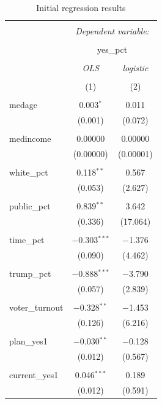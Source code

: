 \documentclass[
]{article}
\begin{document}
\begin{table}[!htbp] \centering 
  \caption{Initial regression results} 
  \label{initialResults} 
\begin{tabular}{@{\extracolsep{5pt}}lcc} 
\\[-1.8ex]\hline 
\hline \\[-1.8ex] 
 & \multicolumn{2}{c}{\textit{Dependent variable:}} \\ 
\cline{2-3} 
\\[-1.8ex] & \multicolumn{2}{c}{yes\_pct} \\ 
\\[-1.8ex] & \textit{OLS} & \textit{logistic} \\ 
\\[-1.8ex] & (1) & (2)\\ 
\hline \\[-1.8ex] 
 medage & 0.003$^{*}$ & 0.011 \\ 
  & (0.001) & (0.072) \\ 
  & & \\ 
 medincome & 0.00000 & 0.00000 \\ 
  & (0.00000) & (0.00001) \\ 
  & & \\ 
 white\_pct & 0.118$^{**}$ & 0.567 \\ 
  & (0.053) & (2.627) \\ 
  & & \\ 
 public\_pct & 0.839$^{**}$ & 3.642 \\ 
  & (0.336) & (17.064) \\ 
  & & \\ 
 time\_pct & $-$0.303$^{***}$ & $-$1.376 \\ 
  & (0.090) & (4.462) \\ 
  & & \\ 
 trump\_pct & $-$0.888$^{***}$ & $-$3.790 \\ 
  & (0.057) & (2.839) \\ 
  & & \\ 
 voter\_turnout & $-$0.328$^{**}$ & $-$1.453 \\ 
  & (0.126) & (6.216) \\ 
  & & \\ 
 plan\_yes1 & $-$0.030$^{**}$ & $-$0.128 \\ 
  & (0.012) & (0.567) \\ 
  & & \\ 
 current\_yes1 & 0.046$^{***}$ & 0.189 \\ 
  & (0.012) & (0.591) \\ 

\end{tabular}
\end{table}
\end{document}
